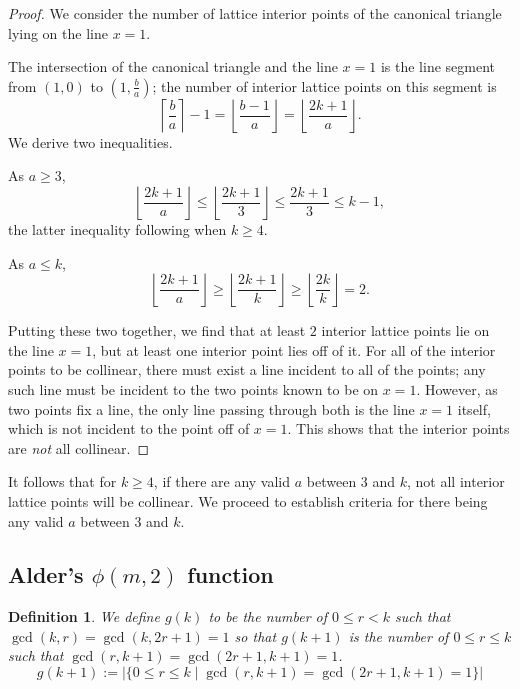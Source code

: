 \documentclass{article}
\theoremstyle{mydefstyle}
\newtheorem*{definition}{Definition}
\begin{document}
\begin{proof}
We consider the number of lattice interior points of the canonical triangle lying on the line $x=1$. 


The intersection of the canonical triangle and the line $x=1$ is the line segment from $(1,0)$ to $\left(1,\frac ba\right)$; the number of interior lattice points on this segment is \[\left\lceil\frac ba\right\rceil-1=\left\lfloor\frac{b-1}a\right\rfloor=\left\lfloor\frac{2k+1}a\right\rfloor.\] We derive two inequalities. 

As $a\ge3$, \begin{equation}\left\lfloor\frac{2k+1}a\right\rfloor\le\left\lfloor\frac{2k+1}3\right\rfloor\le\frac{2k+1}3\le k-1,\end{equation} the latter inequality following when $k\ge4$. 

As $a\le k$, \begin{equation}\left\lfloor\frac{2k+1}a\right\rfloor\ge\left\lfloor\frac{2k+1}k\right\rfloor\ge\left\lfloor\frac{2k}k\right\rfloor=2.\end{equation} 

Putting these two together, we find that at least $2$ interior lattice points lie on the line $x=1$, but at least one interior point lies off of it. For all of the interior points to be collinear, there must exist a line incident to all of the points; any such line must be incident to the two points known to be on $x=1$. However, as two points fix a line, the only line passing through both is the line $x=1$ itself, which is not incident to the point off of $x=1$. This shows that the interior points are \textit{not} all collinear. 
\end{proof}

It follows that for $k\ge4$, if there are any valid $a$ between $3$ and $k$, not all interior lattice points will be collinear. We proceed to establish criteria for there being any valid $a$ between $3$ and $k$. 

\subsection{Alder's $\phi(m,2)$ function}

\begin{definition}
We define $g(k)$ to be the number of $0\le r<k$ such that $\gcd(k,r)=\gcd(k,2r+1)=1$ so that $g(k+1)$ is the number of $0\le r\le k$ such that $\gcd(r,k+1)=\gcd(2r+1,k+1)=1$. \[g(k+1):=|\{0\le r\le k\mid\gcd(r,k+1)=\gcd(2r+1,k+1)=1\}|\]
\end{definition}
\end{document}
